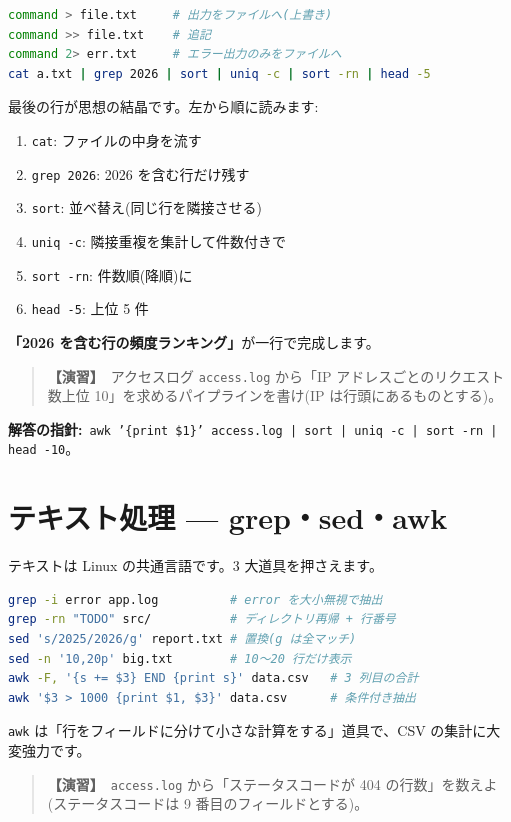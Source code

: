 \documentclass{article}
\begin{document}
\begin{lstlisting}[language=bash]
command > file.txt     # 出力をファイルへ(上書き)
command >> file.txt    # 追記
command 2> err.txt     # エラー出力のみをファイルへ
cat a.txt | grep 2026 | sort | uniq -c | sort -rn | head -5
\end{lstlisting}

最後の行が思想の結晶です。左から順に読みます:
\begin{enumerate}
\item \texttt{cat}: ファイルの中身を流す
\item \texttt{grep 2026}: 2026 を含む行だけ残す
\item \texttt{sort}: 並べ替え(同じ行を隣接させる)
\item \texttt{uniq -c}: 隣接重複を集計して件数付きで
\item \texttt{sort -rn}: 件数順(降順)に
\item \texttt{head -5}: 上位 5 件
\end{enumerate}
\textbf{「2026 を含む行の頻度ランキング」}が一行で完成します。

\begin{quote}
\textbf{【演習】}\ アクセスログ \texttt{access.log} から「IP アドレスごとのリクエスト数上位 10」を求めるパイプラインを書け(IP は行頭にあるものとする)。
\end{quote}

\textbf{解答の指針:}\ \texttt{awk '\{print \$1\}' access.log | sort | uniq -c | sort -rn | head -10}。

\section{テキスト処理 — grep・sed・awk}

テキストは Linux の共通言語です。3 大道具を押さえます。

\begin{lstlisting}[language=bash]
grep -i error app.log          # error を大小無視で抽出
grep -rn "TODO" src/           # ディレクトリ再帰 + 行番号
sed 's/2025/2026/g' report.txt # 置換(g は全マッチ)
sed -n '10,20p' big.txt        # 10〜20 行だけ表示
awk -F, '{s += $3} END {print s}' data.csv   # 3 列目の合計
awk '$3 > 1000 {print $1, $3}' data.csv      # 条件付き抽出
\end{lstlisting}

\texttt{awk} は「行をフィールドに分けて小さな計算をする」道具で、CSV の集計に大変強力です。

\begin{quote}
\textbf{【演習】}\ \texttt{access.log} から「ステータスコードが 404 の行数」を数えよ(ステータスコードは 9 番目のフィールドとする)。
\end{quote}
\end{document}
